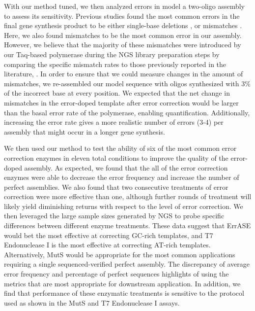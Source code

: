 \documentclass[letterpaper,12pt]{article}
\begin{document}
With our method tuned, we then analyzed errors in model a two-oligo assembly to assess its sensitivity. Previous studies found the most common errors in the final gene synthesis product to be either single-base deletions \cite{carr2004,sequeira2016,saaem2012}, or mismatches \cite{fuhrmann2005,wan2014}. Here, we also found mismatches to be the most common error in our assembly. However, we believe that the majority of these mismatches were introduced by our Taq-based polymerase during the NGS library preparation steps by comparing the specific mismatch rates to those previously reported in the literature, \cite{keohavong1989,hestand2016,mcinerney2014,saiki1988,lee2016}. In order to ensure that we could measure changes in the amount of mismatches, we re-assembled our model sequence with oligos synthesized with 3\% of the incorrect base at every position. We expected that the net change in mismatches in the error-doped template after error correction would be larger than the basal error rate of the polymerase, enabling quantification. Additionally, increasing the error rate gives a more realistic number of errors (3-4) per assembly that might occur in a longer gene synthesis.

We then used our method to test the ability of six of the most common error correction enzymes in eleven total conditions to improve the quality of the error-doped assembly. As expected, we found that the all of the error correction enzymes were able to decrease the error frequency and increase the number of perfect assemblies. We also found that two consecutive treatments of error correction were more effective than one, although further rounds of treatment will likely yield diminishing returns with respect to the level of error correction. We then leveraged the large sample sizes generated by NGS to probe specific differences between different enzyme treatments. These data suggest that ErrASE would bet the most effective at correcting GC-rich templates, and T7 Endonuclease I is the most effective at correcting AT-rich templates. Alternatively, MutS would be appropriate for the most common applications requiring a single sequenced-verified perfect assembly. The discrepancy of average error frequency and percentage of perfect sequences highlights of using the metrics that are most appropriate for downstream application. In addition, we find that performance of these enzymatic treatments is sensitive to the protocol used as shown in the MutS and T7 Endonuclease I assays.
\end{document}
